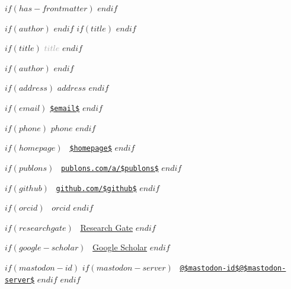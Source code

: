 $if(has-frontmatter)$
\frontmatter
$endif$

\fancyhead{}
$if(author)$
$endif$
$if(title)$
$endif$

\pagestyle{fancy}
\thispagestyle{plain}

$if(title)$
{\large\textcolor{darkgray}{$title$}}\smallskip
$endif$

$if(author)$
\smallskip
$endif$

\noindent {\large \today}

\baselineskip

\begin{minipage}[t]{0.5\textwidth}
  $if(address)$
  \small\noindent $address$
  $endif$

  $if(email)$
  \href{mailto:$email$}{\nolinkurl{$email$}}
  $endif$

  $if(phone)$
  \href{tel:$phone$}{$phone$}
  $endif$
\end{minipage}%
\begin{minipage}[t]{0.5\textwidth}
  \raggedleft\small

  $if(homepage)$
  {\faHome}\, 
  \href{$homepage$}{\nolinkurl{$homepage$}}
  $endif$

  $if(publons)$
  {\aiPublons}\, 
  \href{https://publons.com/a/$publons$}{\nolinkurl{publons.com/a/$publons$}}
  $endif$

  $if(github)$
  {\faGithub}\, 
  \href{https://github.com/$github$}{\nolinkurl{github.com/$github$}}
  $endif$

  $if(orcid)$
  {\aiOrcid}\, 
  \href{https://orcid.org/$orcid$}{$orcid$}
  $endif$

  $if(researchgate)$
  {\aiResearchGate}\, 
  \href{https://www.researchgate.net/profile/$researchgate$}{Research Gate}
  $endif$

  $if(google-scholar)$
  {\aiGoogleScholar}\, \href{https://scholar.google.com/citations?user=$google-scholar$}{Google Scholar}
  $endif$

  $if(mastodon-id)$
  $if(mastodon-server)$
  {\faMastodon}\, 
  \href{https://$mastodon-server$/@$mastodon-id$}{\nolinkurl{@$mastodon-id$@$mastodon-server$}}
  $endif$
  $endif$
\end{minipage}
